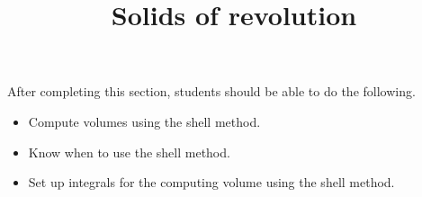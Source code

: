 \documentclass{ximera}
\title{Solids of revolution}
\begin{document}
\begin{abstract}
\end{abstract}

\maketitle

\begin{sectionOutcomes}

After completing this section, students should be able to do the following.

\begin{itemize}
\item Compute volumes using the shell method.
\item Know when to use the shell method.
\item Set up integrals for the computing volume using the shell method.
\end{itemize}

\end{sectionOutcomes}
\end{document}
